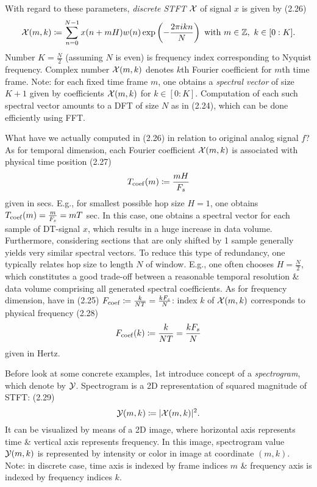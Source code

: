 \documentclass{article}
\begin{document}
\begin{itemize}
\begin{itemize}
\begin{itemize}
			With regard to these parameters, {\it discrete STFT} ${\cal X}$ of signal $x$ is given by (2.26)
			\begin{equation*}
				{\cal X}(m,k)\coloneqq\sum_{n=0}^{N-1} x(n + mH)w(n)\exp\left(-\frac{2\pi ikn}{N}\right)\mbox{ with } m\in\mathbb{Z},\ k\in[0:K].
			\end{equation*}
			Number $K = \frac{N}{2}$ (assuming $N$ is even) is frequency index corresponding to Nyquist frequency. Complex number ${\cal X}(m,k)$ denotes $k$th Fourier coefficient for $m$th time frame. Note: for each fixed time frame $m$, one obtains a {\it spectral vector} of size $K + 1$ given by coefficients ${\cal X}(m,k)$ for $k\in[0:K]$. Computation of each such spectral vector amounts to a DFT of size $N$ as in (2.24), which can be done efficiently using FFT.
			
			What have we actually computed in (2.26) in relation to original analog signal $f$? As for temporal dimension, each Fourier coefficient ${\cal X}(m,k)$ is associated with physical time position (2.27)
			\begin{equation*}
				T_{\rm coef}(m)\coloneqq\frac{mH}{F_s}
			\end{equation*}
			given in secs. E.g., for smallest possible hop size $H = 1$, one obtains $T_{\rm coef}(m) = \frac{m}{F_s} = mT$ sec. In this case, one obtains a spectral vector for each sample of DT-signal $x$, which results in a huge increase in data volume. Furthermore, considering sections that are only shifted by 1 sample generally yields very similar spectral vectors. To reduce this type of redundancy, one typically relates hop size to length $N$ of window. E.g., one often chooses $H = \frac{N}{2}$, which constitutes a good trade-off between a reasonable temporal resolution \& data volume comprising all generated spectral coefficients. As for frequency dimension, have in (2.25) $F_{\rm coef}\coloneqq\frac{k}{NT} = \frac{kF_s}{N}$: index $k$ of ${\cal X}(m,k)$ corresponds to physical frequency (2.28)
			\begin{equation*}
				F_{\rm coef}(k)\coloneqq\frac{k}{NT} = \frac{kF_s}{N}
			\end{equation*}
			given in Hertz.
			
			Before look at some concrete examples, 1st introduce concept of a {\it spectrogram}, which denote by ${\cal Y}$. Spectrogram is a 2D representation of squared magnitude of STFT: (2.29)
			\begin{equation*}
				{\cal Y}(m,k)\coloneqq|{\cal X}(m,k)|^2.
			\end{equation*}
			It can be visualized by means of a 2D image, where horizontal axis represents time \& vertical axis represents frequency. In this image, spectrogram value ${\cal Y}(m,k)$ is represented by intensity or color in image at coordinate $(m,k)$. Note: in discrete case, time axis is indexed by frame indices $m$ \& frequency axis is indexed by frequency indices $k$.
			

\end{itemize}
\end{itemize}
\end{itemize}
\end{document}
